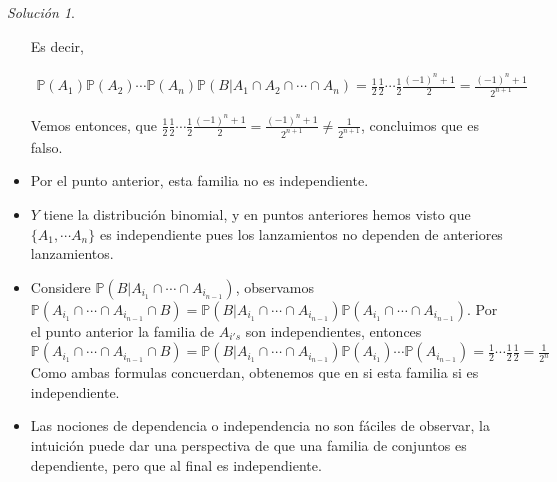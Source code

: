 \documentclass[notitlepage]{article}
\theoremstyle{definition}
\theoremstyle{remark}
\newtheorem*{sol}{Solución}
\newcommand{\prob}[1]{\mathbb{P}(#1)}
\begin{document}
\begin{sol}
\begin{itemize}
			Es decir,
			
			\begin{eqnarray}
			\prob{A_1}\prob{A_2}\cdots\prob{A_n}\prob{B|A_1 \cap A_2 \cap \cdots \cap A_n} \nonumber
			= \frac{1}{2}\frac{1}{2}\cdots\frac{1}{2}\frac{(-1)^n+1}{2} = \frac{(-1)^n+1}{2^{n+1}} \nonumber
			\end{eqnarray}
			
		Vemos entonces, que $ \frac{1}{2}\frac{1}{2}\cdots\frac{1}{2}\frac{(-1)^n+1}{2} = \frac{(-1)^n+1}{2^{n+1}} \neq \frac{1}{2^{n+1}} $, concluimos que es falso.
		\item 
		Por el punto anterior, esta familia no es independiente.
		\item
		$ Y $ tiene la distribución binomial, y en puntos anteriores hemos visto que $ \{A_1,\cdots A_n\} $ es independiente pues los lanzamientos no dependen de anteriores lanzamientos.
		\item
		Considere $ \prob{B|A_{i_{1}} \cap \cdots \cap A_{i_{n-1}}}$, observamos  $ \prob{A_{i_{1}} \cap \cdots \cap A_{i_{n-1}} \cap B} = \prob{B|A_{i_{1}} \cap \cdots \cap A_{i_{n-1}}}\prob{A_{i_{1}} \cap \cdots \cap A_{i_{n-1}}} $. Por el punto anterior la familia de $ A_{i's} $ son independientes, entonces
		$ \displaystyle \prob{A_{i_{1}} \cap \cdots \cap A_{i_{n-1}} \cap B} = \prob{B|A_{i_{1}} \cap \cdots \cap A_{i_{n-1}}} \prob{A_{i_1}} \cdots \prob{A_{i_{n-1}}} = \frac{1}{2}\cdots \frac{1}{2}\frac{1}{2} = \frac{1}{2^n}$ 
		Como ambas formulas concuerdan, obtenemos que en si esta familia si es independiente.
		\item Las nociones de dependencia o independencia no son fáciles de observar, la intuición puede dar una perspectiva de que una familia de conjuntos es dependiente, pero que al final es independiente.
		\end{itemize}
			
	
	\end{sol}
\end{document}
